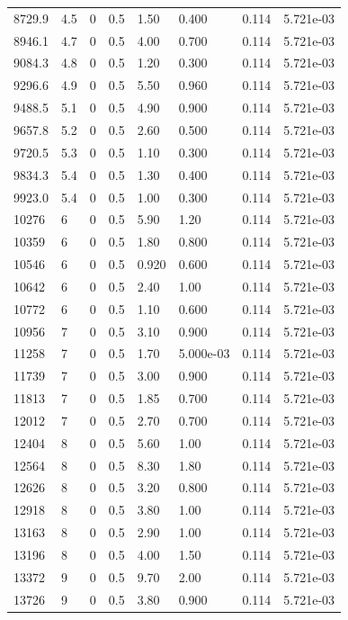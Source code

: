 \documentclass[preview]{standalone}
\begin{document}
{{{{\begin{tabular}{L{1.2cm}C{1.2cm} C{0.3cm}C{0.5cm} C{1.4cm}C{1.4cm} C{1.4cm}C{1.4cm}}
  8729.9  &   4.5  & 0     & 0.5 &  1.50  & 0.400  & 0.114 &  5.721e-03   \\ 
  8946.1  &   4.7  & 0     & 0.5 &  4.00  & 0.700  & 0.114 &  5.721e-03   \\ 
  9084.3  &   4.8  & 0     & 0.5 &  1.20  & 0.300  & 0.114 &  5.721e-03   \\ 
  9296.6  &   4.9  & 0     & 0.5 &  5.50  & 0.960  & 0.114 &  5.721e-03   \\ 
  9488.5  &   5.1  & 0     & 0.5 &  4.90  & 0.900  & 0.114 &  5.721e-03   \\ 
  9657.8  &   5.2  & 0     & 0.5 &  2.60  & 0.500  & 0.114 &  5.721e-03   \\ 
  9720.5  &   5.3  & 0     & 0.5 &  1.10  & 0.300  & 0.114 &  5.721e-03   \\ 
  9834.3  &   5.4  & 0     & 0.5 &  1.30  & 0.400  & 0.114 &  5.721e-03   \\ 
  9923.0  &   5.4  & 0     & 0.5 &  1.00  & 0.300  & 0.114 &  5.721e-03   \\ 
  10276  &     6  & 0     & 0.5 &  5.90  & 1.20  & 0.114 &  5.721e-03   \\ 
  10359  &     6  & 0     & 0.5 &  1.80  & 0.800  & 0.114 &  5.721e-03   \\ 
  10546  &     6  & 0     & 0.5 &  0.920  & 0.600  & 0.114 &  5.721e-03   \\ 
  10642  &     6  & 0     & 0.5 &  2.40  & 1.00  & 0.114 &  5.721e-03   \\ 
  10772  &     6  & 0     & 0.5 &  1.10  & 0.600  & 0.114 &  5.721e-03   \\ 
  10956  &     7  & 0     & 0.5 &  3.10  & 0.900  & 0.114 &  5.721e-03   \\ 
  11258  &     7  & 0     & 0.5 &  1.70  & 5.000e-03  & 0.114 &  5.721e-03   \\ 
  11739  &     7  & 0     & 0.5 &  3.00  & 0.900  & 0.114 &  5.721e-03   \\ 
  11813  &     7  & 0     & 0.5 &  1.85  & 0.700  & 0.114 &  5.721e-03   \\ 
  12012  &     7  & 0     & 0.5 &  2.70  & 0.700  & 0.114 &  5.721e-03   \\ 
  12404  &     8  & 0     & 0.5 &  5.60  & 1.00  & 0.114 &  5.721e-03   \\ 
  12564  &     8  & 0     & 0.5 &  8.30  & 1.80  & 0.114 &  5.721e-03   \\ 
  12626  &     8  & 0     & 0.5 &  3.20  & 0.800  & 0.114 &  5.721e-03   \\ 
  12918  &     8  & 0     & 0.5 &  3.80  & 1.00  & 0.114 &  5.721e-03   \\ 
  13163  &     8  & 0     & 0.5 &  2.90  & 1.00  & 0.114 &  5.721e-03   \\ 
  13196  &     8  & 0     & 0.5 &  4.00  & 1.50  & 0.114 &  5.721e-03   \\ 
  13372  &     9  & 0     & 0.5 &  9.70  & 2.00  & 0.114 &  5.721e-03   \\ 
  13726  &     9  & 0     & 0.5 &  3.80  & 0.900  & 0.114 &  5.721e-03   \\ 
\hline 
\end{tabular} 

}}}}
\end{document}
